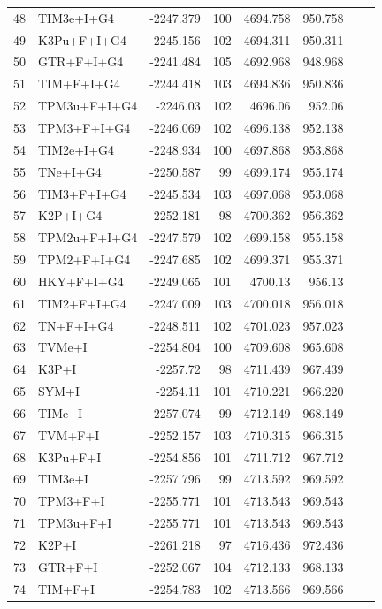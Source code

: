 \documentclass[fleqn,letterpaper]{article}
\begin{document}
\begin{longtable}{clrrrrrr}
	48 & TIM3e+I+G4 & -2247.379 & 100 & 4694.758 & 950.758 \\ 
	49 & K3Pu+F+I+G4 & -2245.156 & 102 & 4694.311 & 950.311 \\ 
	50 & GTR+F+I+G4 & -2241.484 & 105 & 4692.968 & 948.968 \\ 
	51 & TIM+F+I+G4 & -2244.418 & 103 & 4694.836 & 950.836 \\ 
	52 & TPM3u+F+I+G4 & -2246.03 & 102 & 4696.06 & 952.06 \\ 
	53 & TPM3+F+I+G4 & -2246.069 & 102 & 4696.138 & 952.138 \\ 
	54 & TIM2e+I+G4 & -2248.934 & 100 & 4697.868 & 953.868 \\ 
	55 & TNe+I+G4 & -2250.587 & 99 & 4699.174 & 955.174 \\ 
	56 & TIM3+F+I+G4 & -2245.534 & 103 & 4697.068 & 953.068 \\ 
	57 & K2P+I+G4 & -2252.181 & 98 & 4700.362 & 956.362 \\ 
	58 & TPM2u+F+I+G4 & -2247.579 & 102 & 4699.158 & 955.158 \\ 
	59 & TPM2+F+I+G4 & -2247.685 & 102 & 4699.371 & 955.371 \\ 
	60 & HKY+F+I+G4 & -2249.065 & 101 & 4700.13 & 956.13 \\ 
	61 & TIM2+F+I+G4 & -2247.009 & 103 & 4700.018 & 956.018 \\ 
	62 & TN+F+I+G4 & -2248.511 & 102 & 4701.023 & 957.023 \\ 
	63 & TVMe+I & -2254.804 & 100 & 4709.608 & 965.608 \\ 
	64 & K3P+I & -2257.72 & 98 & 4711.439 & 967.439 \\ 
	65 & SYM+I & -2254.11 & 101 & 4710.221 & 966.220 \\ 
	66 & TIMe+I & -2257.074 & 99 & 4712.149 & 968.149 \\ 
	67 & TVM+F+I & -2252.157 & 103 & 4710.315 & 966.315 \\ 
	68 & K3Pu+F+I & -2254.856 & 101 & 4711.712 & 967.712 \\ 
	69 & TIM3e+I & -2257.796 & 99 & 4713.592 & 969.592 \\ 
	70 & TPM3+F+I & -2255.771 & 101 & 4713.543 & 969.543 \\ 
	71 & TPM3u+F+I & -2255.771 & 101 & 4713.543 & 969.543 \\ 
	72 & K2P+I & -2261.218 & 97 & 4716.436 & 972.436 \\ 
	73 & GTR+F+I & -2252.067 & 104 & 4712.133 & 968.133 \\ 
	74 & TIM+F+I & -2254.783 & 102 & 4713.566 & 969.566 \\ 

\end{longtable}
\end{document}
